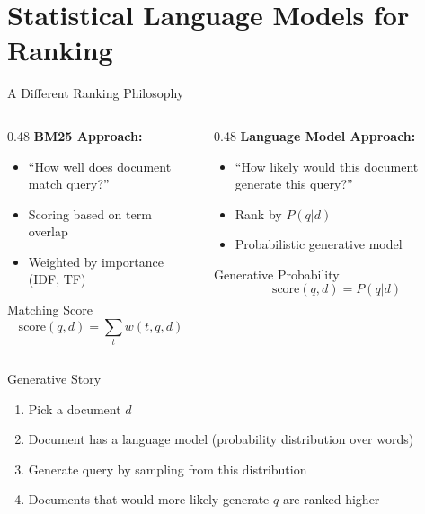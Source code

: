\documentclass[aspectratio=169]{beamer}
\begin{document}
\section{Statistical Language Models for Ranking}

\begin{frame}[plain]
\sectionpage
\end{frame}

\begin{frame}[shrink=5]{A Different Ranking Philosophy}
\begin{columns}
\begin{column}{0.48\textwidth}
\textbf{BM25 Approach:}
\begin{itemize}
    \item ``How well does document match query?''
    \item Scoring based on term overlap
    \item Weighted by importance (IDF, TF)
\end{itemize}

\vspace{0.5em}

\begin{block}{Matching Score}
$$\text{score}(q,d) = \sum_{t} w(t,q,d)$$
\end{block}
\end{column}

\begin{column}{0.48\textwidth}
\textbf{Language Model Approach:}
\begin{itemize}
    \item ``How likely would this document generate this query?''
    \item Rank by $P(q|d)$
    \item Probabilistic generative model
\end{itemize}

\vspace{0.5em}

\begin{block}{Generative Probability}
$$\text{score}(q,d) = P(q|d)$$
\end{block}
\end{column}
\end{columns}

\vspace{1em}

\begin{exampleblock}{Generative Story}
\begin{enumerate}
    \item Pick a document $d$
    \item Document has a language model (probability distribution over words)
    \item Generate query by sampling from this distribution
    \item Documents that would more likely generate $q$ are ranked higher
\end{enumerate}
\end{exampleblock}
\end{frame}
\end{document}

